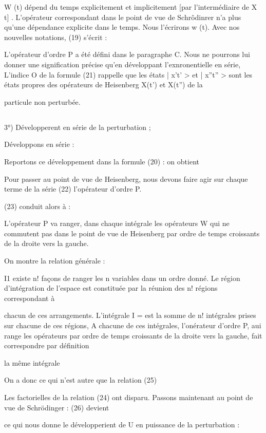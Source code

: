 W (t) dépend du temps explicitement et implicitement [par l'intermédiaire
de X t] . L'opérateur correspondant dans le point de vue de Schrôdinrer
n'a plus qu'une dépendance explicite dans le temps. Nous l'écrirons w (t).
Avec nos nouvelles notations, (19) s'écrit :

L'opérateur d'ordre P a été défini dans le paragraphe C. Nous ne pourrons lui
donner une signification précise qu'en développant l'exnronentielle en série,
L'indice O de la formule (21) rappelle que les états | x't' > et | x''t'' >
sont les états propres des opérateurs de Heisenberg X(t') et X(t'') de la

particule non perturbée.

\subsection{}
3°) Développerent en série de la perturbation ;


Développons en série :

Reportons ce développement dans la formule (20) : on obtient
%

Pour passer au point de vue de Heisenberg, nous devons faire
agir sur chaque terme de la série (22) l'opérateur d'ordre P.

(23) conduit alors à :

L'opérateur P va ranger, dans chaque intégrale les opérateurs W qui ne commutent pas dans le point de vue de Heisenberg par ordre de temps croissants
de la droite vers la gauche.

On montre la relation générale :

I1 existe n! façons de ranger les n variables dans un ordre
donné. Le région d'intégration de l'espace
 est constituée par la réunion des n! régions correspondant à

chacun de ces arrangements. L'intégrale I =
est la somme de n! intégrales prises sur chacune de ces régions, A chacune de
ces intégrales, l'onérateur d'ordre P, aui range les opérateurs par ordre de
temps croissants de la droite vers la gauche, fait correspondre par définition

la même intégrale



On a donc  ce qui n'est autre que la relation (25)

Les factorielles de la relation (24) ont disparu.
Passons maintenant au point de vue de Schrödinger :
(26) devient

ce qui nous donne le développerient de U en puissance de la perturbation :

